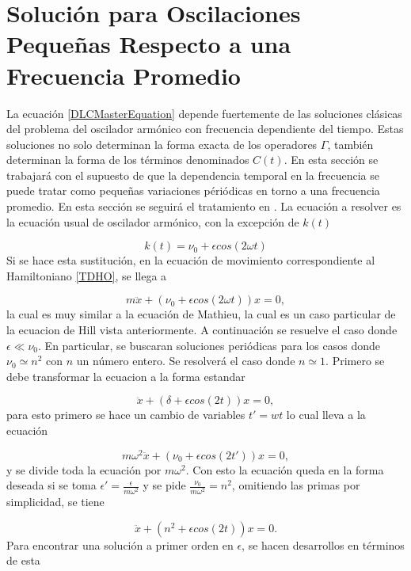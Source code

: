 \documentclass[a4paper,10pt]{report}
\begin{document}
\section{Solución para Oscilaciones Pequeñas Respecto a una Frecuencia Promedio}

La ecuación \eqref{DLCMasterEquation} depende fuertemente de las soluciones clásicas del problema del oscilador armónico con frecuencia dependiente del tiempo. Estas soluciones no solo determinan la forma exacta de los operadores $\Gamma$, también determinan la forma de los términos denominados $C(t)$. En esta sección se trabajará con el supuesto de que la dependencia temporal en la frecuencia se puede tratar como pequeñas variaciones périódicas en torno a una frecuencia promedio. En esta sección se seguirá el tratamiento en \cite{WardFT}. La ecuación a resolver es la ecuación usual de oscilador armónico, con la excepción de $k(t)$ 

\begin{equation}
k(t) = \nu_0 + \epsilon cos(2\omega t)
\end{equation}Si se hace esta sustitución, en la ecuación de movimiento correspondiente al Hamiltoniano \eqref{TDHO}, se llega a

\begin{equation}
m\ddot{x} + (\nu_0 + \epsilon cos(2\omega t))x = 0,
\end{equation} la cual es muy similar a la ecuación de Mathieu, la cual es un caso particular de la ecuacion de Hill vista anteriormente. A continuación se resuelve el caso donde $\epsilon \ll \nu_0$. En particular, se buscaran soluciones periódicas para los casos donde $\nu_0 \simeq n^2$ con $n$ un número entero. Se resolverá el caso donde $n \simeq 1$. Primero se debe transformar la ecuacion a la forma estandar

\begin{equation}
\ddot{x} + (\delta+\epsilon cos(2t))x=0,
\end{equation} para esto primero se hace un cambio de variables $t' = wt$ lo cual lleva a la ecuación

\begin{equation}
m\omega^2\ddot{x}+(\nu_0+\epsilon cos(2t'))x=0,
\end{equation} y se divide toda la ecuación por $m\omega^2$. Con esto la ecuación queda en la forma deseada si se toma $\epsilon' = \frac{\epsilon}{m\omega^2}$ y se pide $\frac{\nu_0}{m\omega^2} = n^2$, omitiendo las primas por simplicidad, se tiene

\begin{equation} \label{MathieuEquation}
\ddot{x} + (n^2+\epsilon cos(2t))x=0.
\end{equation} Para encontrar una solución a primer orden en $\epsilon$, se hacen desarrollos en términos de esta
\end{document}
